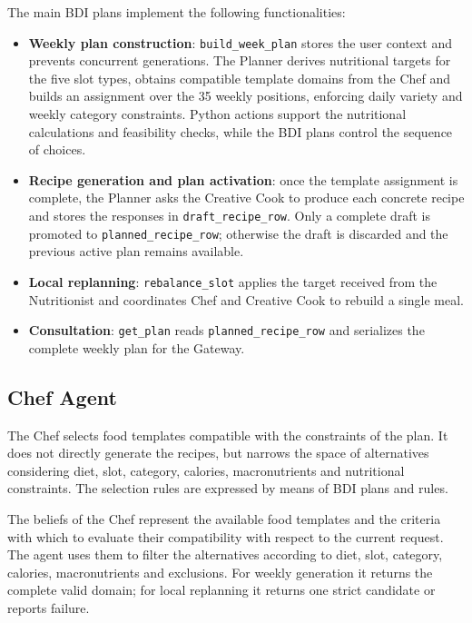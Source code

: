 \documentclass[12pt,a4paper]{article}
\begin{document}
The main BDI plans implement the following functionalities:
\begin{itemize}
    \item \textbf{Weekly plan construction}: \texttt{build\_week\_plan} stores the user context and prevents concurrent generations. The Planner derives nutritional targets for the five slot types, obtains compatible template domains from the Chef and builds an assignment over the 35 weekly positions, enforcing daily variety and weekly category constraints. Python actions support the nutritional calculations and feasibility checks, while the BDI plans control the sequence of choices.
    \item \textbf{Recipe generation and plan activation}: once the template assignment is complete, the Planner asks the Creative Cook to produce each concrete recipe and stores the responses in \texttt{draft\_recipe\_row}. Only a complete draft is promoted to \texttt{planned\_recipe\_row}; otherwise the draft is discarded and the previous active plan remains available.
    \item \textbf{Local replanning}: \texttt{rebalance\_slot} applies the target received from the Nutritionist and coordinates Chef and Creative Cook to rebuild a single meal.
    \item \textbf{Consultation}: \texttt{get\_plan} reads \texttt{planned\_recipe\_row} and serializes the complete weekly plan for the Gateway.
\end{itemize}

\subsection{Chef Agent}

The Chef selects food templates compatible with the constraints of the plan. It does not directly generate
the recipes, but narrows the space of alternatives considering diet, slot, category, calories,
macronutrients and nutritional constraints. The selection rules are expressed by means of BDI plans and rules.

The beliefs of the Chef represent the available food templates and the criteria with which to evaluate
their compatibility with respect to the current request. The agent uses them to filter the alternatives
according to diet, slot, category, calories, macronutrients and exclusions. For weekly generation it
returns the complete valid domain; for local replanning it returns one strict candidate or reports failure.
\end{document}
